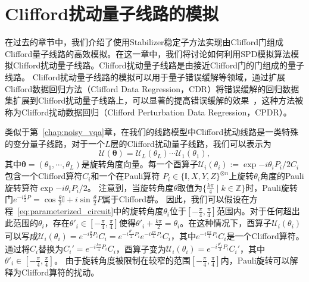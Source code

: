 \chapter{Clifford扰动量子线路的模拟}

在过去的章节中，我们介绍了使用Stabilizer稳定子方法实现由Clifford门组成Clifford量子线路的高效模拟。在这一章中，我们将讨论如何利用SPD模拟算法模拟Clifford扰动量子线路。Clifford扰动量子线路是由接近Clifford门的门组成的量子线路。
Clifford扰动量子线路的模拟可以用于量子错误缓解等领域，通过扩展Clifford数据回归方法（Clifford Data Regression，CDR）将错误缓解的回归数据集扩展到Clifford扰动量子线路上，可以显著的提高错误缓解的效果~\cite{zhang2024clifford}，这种方法被称为Clifford扰动数据回归（Clifford Perturbation Data Regression，CPDR）。

类似于第~\ref{chap:noisy_vqa}章，在我们的线路模型中Clifford扰动线路是一类特殊的变分量子线路，对于一个$L$层的Clifford扰动量子线路，我们可以表示为
\begin{equation}\label{eq:parameterized_circuit}
    \mathcal{U}(\bm{\theta})=\mathcal{U}_L(\theta_L)  \cdots \mathcal{U}_1(\theta_1),
\end{equation}
其中$\bm{\theta}=(\theta_1,\cdots,\theta_L)$是旋转角度向量。每一个酉算子$\mathcal{U}_i(\theta_i):=\exp{-i \theta_i P_i / 2}C_i $ 包含一个Clifford算符$C_i$和一个在Pauli算符 $P_i\in\{\mathbb{I},X,Y,Z\}^{\otimes n}$上旋转$\theta_i$角度的Pauli旋转算符$\exp{-i \theta_i P_i / 2}$。
注意到，当旋转角度$\theta$取值为$\{\frac{k\pi}{4}\mid k\in \mathbb{Z}\}$时，Pauli旋转门$e^{-i\frac{\theta}{2} P}=\cos{\frac{\theta}{2}}\mathbb{I}+i\sin{\frac{\theta}{2}}P$属于Clifford群。
因此，我们可以假设在方程~\eqref{eq:parameterized_circuit}中的旋转角度$\theta_i$位于$[-\frac{\pi}{4},\frac{\pi}{4}]$范围内。对于任何超出此范围的$\theta_i$，存在$\theta'_i\in [-\frac{\pi}{4},\frac{\pi}{4}]$使得$\theta'_i+\frac{k\pi}{2}=\theta_i$。在这种情况下，酉算子$\mathcal{U}_i(\theta_i)$可以写成$\mathcal{U}_i(\theta_i)=e^{-i\frac{\theta}{2} P_i}C_i=e^{-i\frac{\theta'_i}{2} P_i}e^{-i\frac{k\pi}{4} P_i}C_i$，其中$e^{-i\frac{k\pi}{4} P_i}C_i$是一个Clifford算符。通过将$C_i$替换为$C_i'=e^{-i\frac{k\pi}{4} P_i}C_i$，酉算子变为$\mathcal{U}_i(\theta_i)=e^{-i\frac{\theta'_i}{2} P_i}C_i'$，其中$\theta'_i\in [-\frac{\pi}{4},\frac{\pi}{4}]$。
由于旋转角度被限制在较窄的范围$[-\frac{\pi}{4},\frac{\pi}{4}]$内，Pauli旋转可以解释为Clifford算符的扰动。

